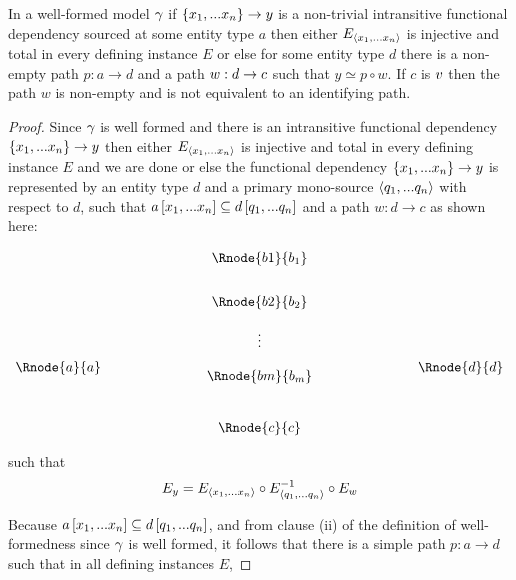 \begin{lemma}
\label{intransitivelemma}
In a well-formed model $\gamma$ if $\left\{x_1,...x_n\right\} \rightarrow y$  is a non-trivial intransitive
functional dependency sourced at some entity type $a$ then either $E_{\langle x_1,...x_n\rangle}$ is injective and total in every defining instance $E$ 
or else for some entity type $d$ there is a non-empty path $p:a \rightarrow d$
and a  path $w:d \rightarrow c$  such that $y \simeq p \circ w$. If $c$ is $v$ then
the path $w$ is non-empty and is not equivalent to an identifying path.
\end{lemma}
\begin{proof}
Since $\gamma$ is well formed  and there is an intransitive functional dependency $\left\{x_1,...x_n\right\} \rightarrow y$ then either $E_{\langle x_1,...x_n\rangle}$ is injective and total in every defining instance $E$  and we are done or else the functional dependency
$\left\{x_1,...x_n\right\} \rightarrow y$   is represented 
by  an entity type $d$ and 
a primary mono-source $\langle q_1,...q_n\rangle$ with respect to
$d$, such that $a\left[x_1,...x_n\right]\subseteq d\left[q_1,...q_n\right]$ and a 
path $w:d\rightarrow c$ as shown here:

\setlength{\arraycolsep}{.2cm}
\begin{center}
$
\begin{array}{cp{2cm}c p{2cm} c}
             &  & \Rnode{b1}{b_1} & &               \\ [0.7cm]
						 &  & \Rnode{b2}{b_2} & &               \\ [0.4cm]
						 &  &     \vdots      & &               \\ [0.2cm]
\Rnode{a}{a} &  &                 & & \Rnode{d}{d}  \\ [-0.2cm]
             &  & \Rnode{bm}{b_m} & &               \\ [0.9cm]
             &  & \Rnode{c}{c}    & &               \\
\end{array}
$
\end{center}
such that
\begin{equation}
\label{fundependency}
E_y = E_{\langle x_1,...x_n\rangle} \circ E_{\langle q_1,...q_n\rangle}^{-1} \circ E_w
\end{equation}

Because $a\left[x_1,...x_n\right]\subseteq d\left[q_1,...q_n\right]$,  and from
clause (ii) of the definition of well-formedness since $\gamma$ is well formed, it follows that
there  is a simple path $p:a \rightarrow d$ such
that 
in all defining instances $E$,


\end{proof}
